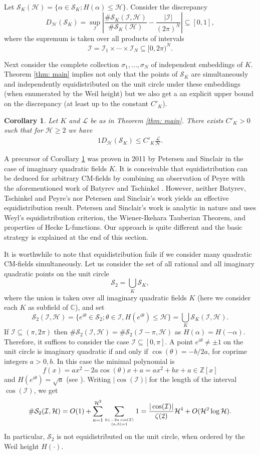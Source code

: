 \documentclass[11pt]{amsart}
\newtheorem{corollary}{Corollary}[section]
\numberwithin{equation}{eqncounter}
\def\IC{\mathbb C}
\def\IZ{\mathbb Z}
\def\IL{\mathcal{L}}
\def\H{\mathcal{H}}
\def\I{\mathcal{I}}
\def\Sc{\mathcal{S}}
\begin{document}
Let $\Sc_K(\H)=\{\alpha\in \Sc_K; H(\alpha)\leq \H\}$.
Consider the discrepancy 
$$D_\H(\Sc_K)=\sup_{\I}\left|\frac{\#\Sc_K(\I,\H)}{\#\Sc_K(\H)}-\frac{|\I|}{(2\pi)^N}\right|\subseteq [0,1],$$
where the supremum is taken over all products of intervals 
$$\I=\I_1\times \cdots \times \I_N\subseteq [0,2\pi)^N.$$

Next consider the complete collection $\sigma_1,\ldots,\sigma_N$ of independent embeddings of $K$. 
Theorem \ref{thm: main} implies not only that the points of $\Sc_K$ are simultaneously and independently equidistributed on the unit circle under these embeddings (when enumerated by the Weil height)
but we also get a an explicit upper bound on the discrepancy (at least up to the constant $C'_K$).
\begin{corollary}\label{cor: discrep}
Let $K$ and $\IL$ be as in Theorem \ref{thm: main}. There exists $C'_K>0$ such that for $\H\geq 2$ we have
\begin{alignat}1\label{eq: discrp}
D_\H(\Sc_K)\leq C'_K \frac{\IL}{\H}.
\end{alignat}
\end{corollary}
A  precursor of Corollary \ref{cor: discrep} was proven
in 2011 by Petersen and Sinclair \cite[Theorem 2.1]{PetersenSinclair2011}
in the case of imaginary quadratic fields $K$. It is conceivable that  equidistribution can be deduced for arbitrary CM-fields by combining an observation of Peyre \cite[Proposition 5.0.1]{Peyre1995} with the aforementioned work of Batyrev and Tschinkel \cite{BatyrevTschinkel1998}.
However, neither Batyrev, Tschinkel and Peyre's nor Petersen and Sinclair's work yields an effective equidistribution result.
Petersen and Sinclair's work is analytic in nature and uses Weyl's equidistribution
criterion, the Wiener-Ikehara Tauberian Theorem, and properties of Hecke L-functions.
Our approach is quite different and the basic strategy is explained at the end of this section.


It is worthwhile to note that equidistribution 
fails if we consider many quadratic CM-fields simultaneously. 
Let  us consider the set  of all rational and all imaginary quadratic points on the unit circle  
$$\Sc_2=\bigcup_K \Sc_K,$$
where the union is taken over all imaginary quadratic fields $K$ (here we consider each 
$K$ as subfield of $\IC$),
and set
$$\Sc_2(\I,\H)=\{e^{i\theta}\in \Sc_2; \theta\in \I, H(e^{i\theta})\leq \H\}=\bigcup_K \Sc_K(\I,\H).$$
If $\I\subseteq (\pi,2\pi)$ then $\#\Sc_2(\I,\H)=\#\Sc_2(\I-\pi,\H)$ as $H(\alpha)=H(-\alpha)$.
Therefore, it suffices to consider the case $\I\subseteq [0,\pi]$.
 A point $e^{i\theta}\neq \pm 1$ on the unit circle is imaginary quadratic
if and only if $\cos(\theta)=-b/2a$, for coprime integers $a>0,b$. In this case the minimal polynomial is 
$$f(x)=ax^2-2a\cos(\theta)x+a=ax^2+bx+a\in \IZ[x]$$
and $H(e^{i\theta})=\sqrt{a}$ (see \cite[Propositions 1.6.5 and 1.6.6]{BG}). 
Writing $|\cos(\I)|$  for the length of the interval $\cos(\I)$, we get
$$\#\Sc_2(\I,\H)=O(1)+\sum_{a=1}^{\H^2}\sum_{b\in -2a\cos(\I) \atop (a,b)=1}1=\frac{|\cos(\I)|}{\zeta(2)}\H^4+O(\H^2\log \H).$$ 
In particular, $\Sc_2$ is not equidistributed  on the unit circle, when ordered by the Weil height $H(\cdot)$.\\ 
\end{document}
